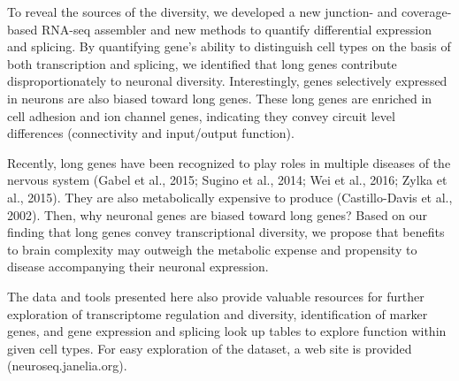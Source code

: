 To reveal the sources of the diversity, we developed a new junction- and coverage-based RNA-seq assembler and new methods to quantify differential expression and splicing. By quantifying gene's ability to distinguish cell types on the basis of both transcription and splicing, we identified that long genes contribute disproportionately to neuronal diversity. Interestingly, genes selectively expressed in neurons are also biased toward long genes. These long genes are enriched in cell adhesion and ion channel genes, indicating they convey circuit level differences (connectivity and input/output function). 

Recently, long genes have been recognized to play roles in multiple diseases of the nervous system (Gabel et al., 2015; Sugino et al., 2014; Wei et al., 2016; Zylka et al., 2015). They are also metabolically expensive to produce (Castillo-Davis et al., 2002). Then, why neuronal genes are biased toward long genes? Based on our finding that long genes convey transcriptional diversity, we propose that benefits to brain complexity may outweigh the metabolic expense and propensity to disease accompanying their neuronal expression. 

The data and tools presented here also provide valuable resources for further exploration of transcriptome regulation and diversity, identification of marker genes, and gene expression and splicing look up tables to explore function within given cell types. For easy exploration of the dataset, a web site is provided (neuroseq.janelia.org). 